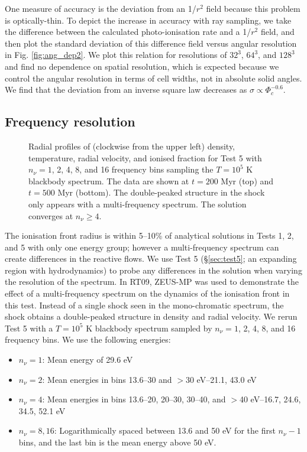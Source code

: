 \documentclass[useAMS,usenatbib]{mn2e}
\begin{document}
One measure of accuracy is the deviation from an 1/$r^2$ field because
this problem is optically-thin.  To depict the increase in accuracy
with ray sampling, we take the difference between the calculated
photo-ionisation rate and a 1/$r^2$ field, and then plot the standard
deviation of this difference field versus angular resolution in Fig.
\ref{fig:ang_dep2}.  We plot this relation for resolutions of $32^3$,
$64^3$, and $128^3$ and find no dependence on spatial resolution,
which is expected because we control the angular resolution in terms
of cell widths, not in absolute solid angles.  We find that the
deviation from an inverse square law decreases as $\sigma \propto
\Phi_c^{-0.6}$.

\subsection{Frequency resolution}
\label{sec:nu_dep}

\begin{figure}
  \caption{\label{fig:nu_dep} Radial profiles of (clockwise from the
    upper left) density, temperature, radial velocity, and ionised
    fraction for Test 5 with $n_\nu = 1$, 2, 4, 8, and 16 frequency
    bins sampling the $T=10^5$ K blackbody spectrum.  The data are
    shown at $t = 200$ Myr (top) and $t = 500$ Myr (bottom).  The
    double-peaked structure in the shock only appears with a
    multi-frequency spectrum.  The solution converges at $n_\nu \ge
    4$.}
\end{figure}

The ionisation front radius is within 5--10\% of analytical solutions
in Tests 1, 2, and 5 with only one energy group; however a
multi-frequency spectrum can create differences in the reactive flows.
We use Test 5 (\S\ref{sec:test5}; an expanding \hii region with
hydrodynamics) to probe any differences in the solution when varying
the resolution of the spectrum.  In RT09, ZEUS-MP was used to
demonstrate the effect of a multi-frequency spectrum on the dynamics
of the ionisation front in this test.  Instead of a single shock seen
in the mono-chromatic spectrum, the shock obtains a double-peaked
structure in density and radial velocity.  We rerun Test 5 with a
$T=10^5$ K blackbody spectrum sampled by $n_\nu = 1$, 2, 4, 8, and 16
frequency bins.  We use the following energies:
%
\begin{itemize}
\item $n_\nu = 1$: Mean energy of 29.6 eV
\item $n_\nu = 2$: Mean energies in bins 13.6--30 and $>$30 eV--21.1,
  43.0 eV
\item $n_\nu = 4$: Mean energies in bins 13.6--20, 20--30, 30--40, and
  $>$40 eV--16.7, 24.6, 34.5, 52.1 eV
\item $n_\nu = 8, 16$: Logarithmically spaced between 13.6 and 50 eV
  for the first $n_\nu-1$ bins, and the last bin is the mean energy
  above 50 eV.
\end{itemize}
\end{document}
